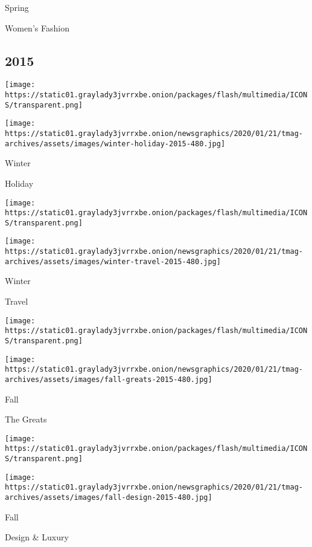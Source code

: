 Spring

Women's Fashion

\hypertarget{2015}{%
\subsection{2015}\label{2015}}

\href{https://www.nytimes3xbfgragh.onion/spotlight/t-magazine-issue-holiday-2015}{}

\texttt{[image: https://static01.graylady3jvrrxbe.onion/packages/flash/multimedia/ICONS/transparent.png]}

\texttt{[image: https://static01.graylady3jvrrxbe.onion/newsgraphics/2020/01/21/tmag-archives/assets/images/winter-holiday-2015-480.jpg]}

Winter

Holiday

\href{https://www.nytimes3xbfgragh.onion/spotlight/t-magazine-issue-winter-travel}{}

\texttt{[image: https://static01.graylady3jvrrxbe.onion/packages/flash/multimedia/ICONS/transparent.png]}

\texttt{[image: https://static01.graylady3jvrrxbe.onion/newsgraphics/2020/01/21/tmag-archives/assets/images/winter-travel-2015-480.jpg]}

Winter

Travel

\href{https://www.nytimes3xbfgragh.onion/spotlight/t-magazine-issue-the-greats}{}

\texttt{[image: https://static01.graylady3jvrrxbe.onion/packages/flash/multimedia/ICONS/transparent.png]}

\texttt{[image: https://static01.graylady3jvrrxbe.onion/newsgraphics/2020/01/21/tmag-archives/assets/images/fall-greats-2015-480.jpg]}

Fall

The Greats

\href{https://www.nytimes3xbfgragh.onion/interactive/2015/09/25/t-magazine/design-luxury-issue.html}{}

\texttt{[image: https://static01.graylady3jvrrxbe.onion/packages/flash/multimedia/ICONS/transparent.png]}

\texttt{[image: https://static01.graylady3jvrrxbe.onion/newsgraphics/2020/01/21/tmag-archives/assets/images/fall-design-2015-480.jpg]}

Fall

Design \& Luxury

\href{https://www.nytimes3xbfgragh.onion/interactive/2015/09/11/t-magazine/fall-men-style-issue.html}{}

